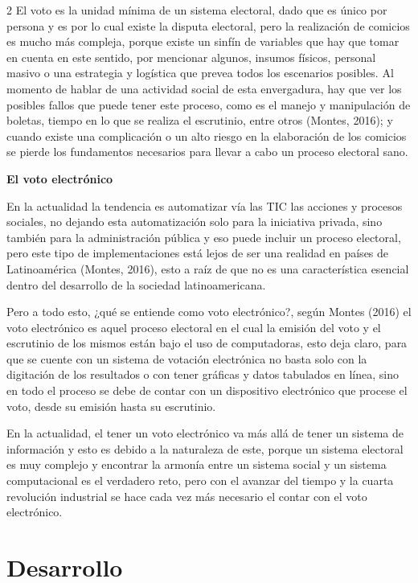 \documentclass[12pt,spanish,Letterpaper,openany]{book}
\begin{document}
\begin {multicols}{2}
El voto es la unidad mínima de un sistema electoral, dado que es único por persona y es por lo cual existe la disputa electoral, pero la realización de comicios es mucho más compleja, porque existe un sinfín de variables que hay que tomar en cuenta en este sentido, por mencionar algunos, insumos físicos, personal masivo o una estrategia y logística que prevea todos los escenarios posibles. Al momento de hablar de una actividad social de esta envergadura, hay que ver los posibles fallos que puede tener este proceso, como es el manejo y manipulación de boletas, tiempo en lo que se realiza el escrutinio, entre otros (Montes, 2016); y cuando existe una complicación o un alto riesgo en la elaboración de los comicios se pierde los fundamentos necesarios para llevar a cabo un proceso electoral sano.

\textbf{El voto electrónico}

En la actualidad la tendencia es automatizar vía las TIC las acciones y procesos sociales, no dejando esta automatización solo para la iniciativa privada, sino también para la administración pública y eso puede incluir un proceso electoral, pero este tipo de implementaciones está lejos de ser una realidad en países de Latinoamérica (Montes, 2016), esto a raíz de que no es una característica esencial dentro del desarrollo de la sociedad latinoamericana.

Pero a todo esto, ¿qué se entiende como voto electrónico?, según Montes (2016) el voto electrónico es aquel proceso electoral en el cual la emisión del voto y el escrutinio de los mismos están bajo el uso de computadoras, esto deja claro, para que se cuente con un sistema de votación electrónica no basta solo con la digitación de los resultados o con tener gráficas y datos tabulados en línea, sino en todo el proceso se debe de contar con un dispositivo electrónico que procese el voto, desde su emisión hasta su escrutinio.

En la actualidad, el tener un voto electrónico va más allá de tener un sistema de información y esto es debido a la naturaleza de este, porque un sistema electoral es muy complejo y encontrar la armonía entre un sistema social y un sistema computacional es el verdadero reto, pero con el avanzar del tiempo y la cuarta revolución industrial se hace cada vez más necesario el contar con el voto electrónico.

\hypertarget{desarrollo}{%
\section{Desarrollo}\label{desarrollo}}


\end{multicols}
\end{document}
